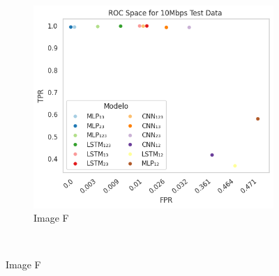 \documentclass[a4paper,fleqn]{cas-sc}
\begin{document}
\begin{figure}
\begin{minipage}[t]{0.46\textwidth}
			~
			\begin{subfigure}[t]{0.33\textwidth}
				\includegraphics[draft=false, width=\textwidth]{./figs/ROC-Space-Test-Data-10Mbps.png} 
				\caption{Image F}
				\label{fig:1c}
			\end{subfigure}%
			~%
			

\end{minipage}
\end{figure}
\end{document}
